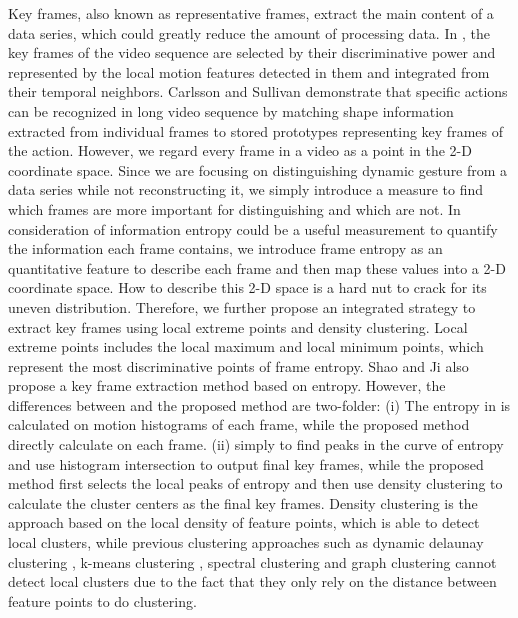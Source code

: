 \documentclass[5p]{elsarticle}
\begin{document}
Key frames, also known as representative frames, extract the main content of a data series, which could greatly reduce the amount of processing data.
In \cite{zhao2008information}, the key frames of the video sequence are selected by their discriminative power and represented by the local motion features detected in them and integrated from their temporal neighbors.
Carlsson and Sullivan \cite{carlsson2001action} demonstrate that specific actions can be recognized in long video sequence by matching shape information extracted from individual frames to stored prototypes representing key frames of the action.
However, we regard every frame in a video as a point in the 2-D coordinate space.
Since we are focusing on distinguishing dynamic gesture from a data series while not reconstructing it, we simply introduce a measure to find which frames are more important for distinguishing and which are not.
In consideration of information entropy  \cite{brink1996using,min2013novel,wang2017ship} could be a useful measurement to quantify the information each frame contains, we introduce frame entropy as an quantitative feature to describe each frame and then map these values into a 2-D coordinate space.
How to describe this 2-D space is a hard nut to crack for its uneven distribution.
Therefore, we further propose an integrated strategy to extract key frames using local extreme points and density clustering.
Local extreme points includes the local maximum and local minimum points, which represent the most discriminative points of frame entropy.
Shao and Ji \cite{shao2009motion} also propose a key frame extraction method based on entropy.
However, the differences between \cite{shao2009motion}  and the proposed method are two-folder: (i) The entropy in \cite{shao2009motion}  is calculated on motion histograms of each frame, while the proposed method directly calculate on each frame.
(ii) \cite{shao2009motion}  simply to find peaks in the curve of entropy and use histogram intersection to output final key frames, while the proposed method first selects the local peaks of entropy and then use density clustering to calculate the cluster centers as the final key frames.
Density clustering \cite{rodriguez2014clustering} is the approach based on the local density of feature points, which is able to detect local clusters, while previous clustering approaches such as dynamic delaunay clustering \cite{kuanar2013video}, k-means clustering \cite{de2011vsumm}, spectral clustering  \cite{vazquez2013spatio} and graph clustering \cite{panda2014scalable} cannot detect local clusters due to the fact that they only rely on the distance between feature points to do clustering.
\end{document}
